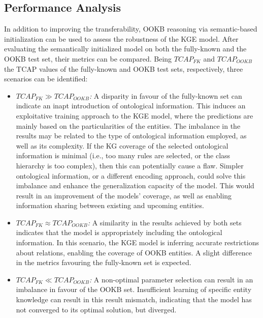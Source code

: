 \subsection{Performance Analysis}
In addition to improving the transferability, OOKB reasoning via semantic-based initialization can be used to assess the robustness of the KGE model. After evaluating the semantically initialized model on both the fully-known and the OOKB test set, their metrics can be compared. Being $TCAP_{FK}$ and $TCAP_{OOKB}$ the TCAP values of the fully-known and OOKB test sets, respectively, three scenarios can be identified:
\begin{itemize}
    \item \textit{$TCAP_{FK} \gg TCAP_{OOKB}$:} A disparity in favour of the fully-known set can indicate an inapt introduction of ontological information. This induces an exploitative training approach to the KGE model, where the predictions are mainly based on the particularities of the entities. The imbalance in the results may be related to the type of ontological information employed, as well as its complexity. If the KG coverage of the selected ontological information is minimal (i.e., too many rules are selected, or the class hierarchy is too complex), then this can potentially cause a flaw. Simpler ontological information, or a different encoding approach, could solve this imbalance and enhance the generalization capacity of the model. This would result in an improvement of the models' coverage, as well as enabling information sharing between existing and upcoming entities.
    
    \item \textit{$TCAP_{FK} \approx TCAP_{OOKB}$:} A similarity in the results achieved by both sets indicates that the model is appropriately including the ontological information. In this scenario, the KGE model is inferring accurate restrictions about relations, enabling the coverage of OOKB entities. A slight difference in the metrics favouring the fully-known set is expected.
    
    \item \textit{$TCAP_{FK} \ll TCAP_{OOKB}$:} A non-optimal parameter selection can result in an imbalance in favour of the OOKB set. Insufficient learning of specific entity knowledge can result in this result mismatch, indicating that the model has not converged to its optimal solution, but diverged.
\end{itemize}

